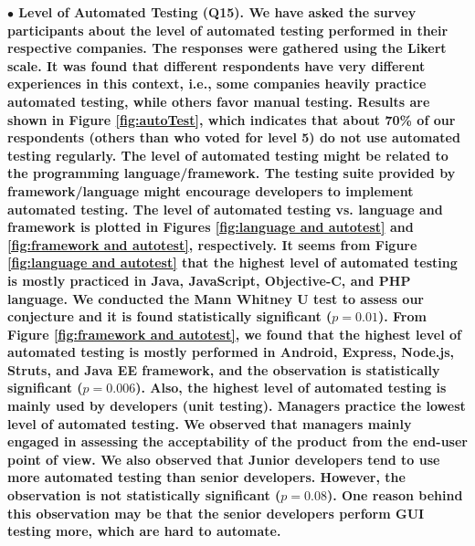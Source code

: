

\nd\bf{$\bullet$ Level of Automated Testing (Q15).}
We have asked the survey participants about the level of automated testing
performed in their respective companies. The responses were gathered using the
Likert scale. It was found that different respondents have very different
experiences in this context, i.e., some companies heavily practice automated
testing, while others favor manual testing. 
Results are shown in Figure
\ref{fig:autoTest}, which indicates that about 70\% of our respondents (others
than who voted for level 5) do not use automated testing regularly. The level of
automated testing might be related to the programming language/framework. The
testing suite provided by framework/language might encourage developers to
implement automated testing. The level of automated testing vs. language and
framework is plotted in Figures \ref{fig:language and autotest} and
\ref{fig:framework and autotest}, respectively. It seems from Figure
\ref{fig:language and autotest} that the highest level of automated testing is
mostly practiced in Java, JavaScript, Objective-C, and PHP language. We
conducted the Mann Whitney U test to assess our conjecture and it is found
statistically significant ($p=0.01$). From Figure \ref{fig:framework and
autotest}, we found that the highest level of automated testing is mostly
performed in Android, Express, Node.js, Struts, and Java EE framework, and the
observation is statistically significant ($p=0.006$). Also, the highest level of
automated testing is mainly used by developers (unit testing). 
Managers practice the lowest level of automated testing. We observed that managers mainly engaged in assessing the
acceptability of the product from the end-user point of view. We also observed that Junior developers tend to use more automated testing than senior
developers. However, the observation is not statistically significant
($p=0.08$). One reason behind this observation may be that the senior
developers perform GUI testing more, which are hard to
automate.


